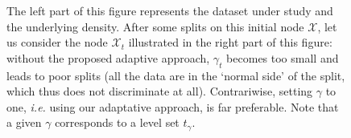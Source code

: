 \begin{figure}
\caption{ The left part of this figure represents
the dataset under study and the underlying density.
After some splits on this initial node $\mathcal{X}$,
let us consider the node $\mathcal{X}_t$ illustrated in the right part of this figure:
without the proposed adaptive approach,
$\gamma_t$ becomes too small
and leads to poor splits %
(all the data are in the `normal side' of the split, which thus does not discriminate at all).
Contrariwise, setting $\gamma$ to one, \textit{i.e.} using our adaptative approach,
is far preferable.
Note that a given $\gamma$ corresponds to a level set $t_{\gamma}$.}
\label{ocrf:fig:split_alpha}

\end{figure}




